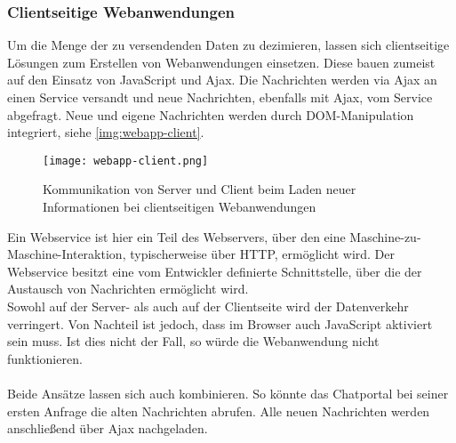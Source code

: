 \subsubsection{Clientseitige Webanwendungen}
\label{sec:client-webanwendung}

Um die Menge der zu versendenden Daten zu dezimieren, lassen sich clientseitige Lösungen zum Erstellen von Webanwendungen einsetzen. Diese bauen zumeist auf den Einsatz von JavaScript und Ajax. Die Nachrichten werden via Ajax an einen Service versandt und neue Nachrichten, ebenfalls mit Ajax, vom Service abgefragt. Neue und eigene Nachrichten werden durch DOM-Manipulation integriert, siehe \autoref{img:webapp-client}. 

\begin{figure}[H]
	\begin{center}
		\texttt{[image: webapp-client.png]}
		\caption{Kommunikation von Server und Client beim Laden neuer Informationen bei clientseitigen Webanwendungen}
		\label{img:webapp-client}
	\end{center}
\end{figure}

Ein Webservice ist hier ein Teil des Webservers, über den eine Maschine-zu-Maschine-Interaktion, typischerweise über HTTP, ermöglicht wird. Der Webservice besitzt eine vom Entwickler definierte Schnittstelle, über die der Austausch von Nachrichten ermöglicht wird.\\
Sowohl auf der Server- als auch auf der Clientseite wird der Datenverkehr verringert. Von Nachteil ist jedoch, dass im Browser auch JavaScript aktiviert sein muss. Ist dies nicht der Fall, so würde die Webanwendung nicht funktionieren. \\
\\
Beide Ansätze lassen sich auch kombinieren. So könnte das Chatportal bei seiner ersten Anfrage die alten Nachrichten abrufen. Alle neuen Nachrichten werden anschließend über Ajax nachgeladen.
